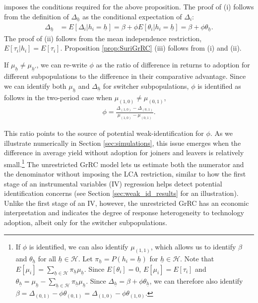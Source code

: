 \documentclass[12pt]{article}
\theoremstyle{plain}
\theoremstyle{definition}
\begin{document}
\citet{S2011} imposes the conditions required for the above proposition. 
The proof of (i) follows from the definition of $\Delta_{\underline{h}}$ as the conditional expectation of $\Delta_i$:
\begin{align}
     \Delta_{\underline{h}}&=E[\Delta_i|h_i=\underline{h}]=\beta+\phi E[\theta_i|h_i=\underline{h}]=\beta+\phi \theta_{\underline{h}}.
\end{align}
The proof of (ii) follows from the mean independence restriction, $E[\tau_i|h_i]=E[\tau_i]$. Proposition \ref{prop:SuriGrRC} (iii) follows  from (i) and (ii). 

If $\mu_{\underline{h}}\neq \mu_{\underline{h}'}$, we can re-write $\phi$ as the ratio of difference in returns to adoption for different subpopulations to the difference in their comparative advantage.  
Since we can identify both $\mu_{\underline{h}}$ and $\Delta_{\underline{h}}$ for switcher subpopulations, $\phi$ is identified as follows in the two-period case when $\mu_{(1,0)}\neq \mu_{(0,1)}$,
\begin{align}
\phi=\frac{\Delta_{(1,0)}-\Delta_{(0,1)}}{\mu_{(1,0)}-\mu_{(0,1)}}.\label{eq:phi_2}
\end{align}

\noindent This ratio points to the source of potential weak-identification for $\phi$.
As we illustrate numerically in Section \ref{sec:simulations}, this issue emerges when the difference in average yield without adoption for joiners and leavers is relatively small.\footnote{If $\phi$ is identified, we can also identify $\mu_{(1,1)}$, which allows us to identify $\beta$ and $\theta_{\underline{h}}$ for all $\underline{h}\in\mathcal{H}$. 
Let $\pi_{\underline{h}}=P(h_{i}=\underline{h})$ for $\underline{h}\in\mathcal{H}$. Note that $E[\mu_{i}]=\sum_{\underline{h}\in\mathcal{H}}\pi_{\underline{h}}\mu_{\underline{h}}$. Since $E[\theta_{i}]=0$, $E[\mu_{i}]=E[\tau_{i}]$ and $
\theta_{\underline{h}} =\mu_{\underline{h}}-\sum_{\underline{h}\in\mathcal{H}}\pi_{\underline{h}}\mu_{\underline{h}}$.
Since $\Delta_{\underline{h}}=\beta+\phi\theta_{\underline{h}}$, we can therefore also identify $\beta=\Delta_{(0,1)}-\phi\theta_{(0,1)}=\Delta_{(1,0)}-\phi\theta_{(1,0)}$.}  
The unrestricted GrRC model lets us estimate both the numerator and the denominator without imposing the LCA restriction, similar to how the first stage of an instrumental variables (IV) regression helps detect potential identification concerns (see Section \ref{sec:weak_id_results} for an illustration). 
Unlike the first stage of an IV, however, the unrestricted GrRC has an economic interpretation and indicates the degree of response heterogeneity to technology adoption, albeit only for the switcher subpopulations.
\end{document}

